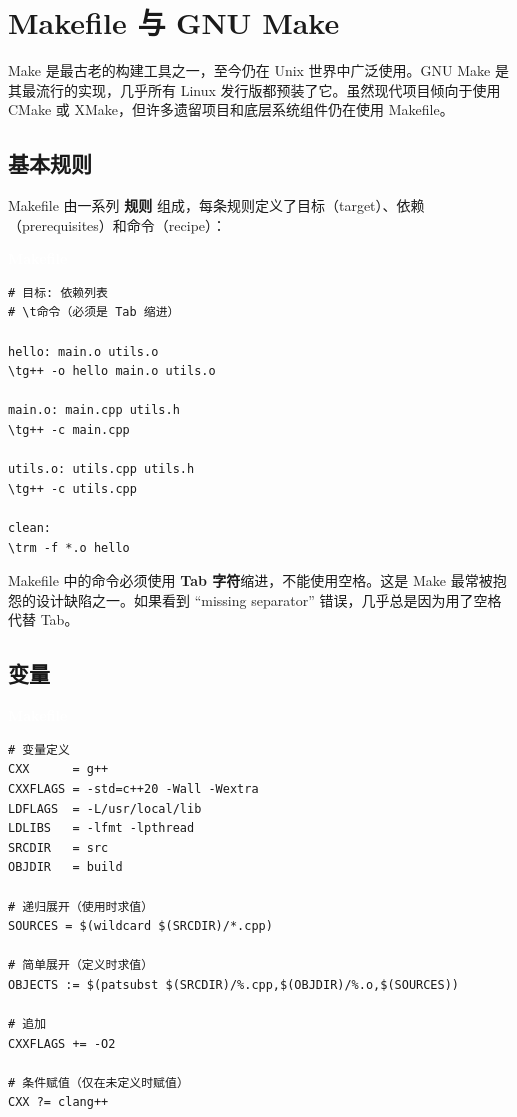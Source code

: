 \documentclass[12pt,a4paper,fontset=fandol]{ctexbook}
\newcommand{\makelabelcmd}{%
  \noindent\begin{tcolorbox}[sharp corners,colback=makeheadbg,colframe=makeheadbg,
    left=6pt,right=6pt,top=2pt,bottom=2pt,boxrule=0pt]
  \textcolor{white}{\small\bfseries\sffamily Makefile}\end{tcolorbox}%
}
\begin{document}
\chapter{Makefile 与 GNU Make}

Make 是最古老的构建工具之一，至今仍在 Unix 世界中广泛使用。GNU Make 是其最流行的实现，几乎所有 Linux 发行版都预装了它。虽然现代项目倾向于使用 CMake 或 XMake，但许多遗留项目和底层系统组件仍在使用 Makefile。

\section{基本规则}

Makefile 由一系列 \textbf{规则} 组成，每条规则定义了目标（target）、依赖（prerequisites）和命令（recipe）：

\makelabelcmd
\begin{lstlisting}[style=bashstyle]
# 目标: 依赖列表
# \t命令（必须是 Tab 缩进）

hello: main.o utils.o
\tg++ -o hello main.o utils.o

main.o: main.cpp utils.h
\tg++ -c main.cpp

utils.o: utils.cpp utils.h
\tg++ -c utils.cpp

clean:
\trm -f *.o hello
\end{lstlisting}

\begin{warning}
Makefile 中的命令必须使用 \textbf{Tab 字符}缩进，不能使用空格。这是 Make 最常被抱怨的设计缺陷之一。如果看到 ``missing separator'' 错误，几乎总是因为用了空格代替 Tab。
\end{warning}

\section{变量}

\makelabelcmd
\begin{lstlisting}[style=bashstyle]
# 变量定义
CXX      = g++
CXXFLAGS = -std=c++20 -Wall -Wextra
LDFLAGS  = -L/usr/local/lib
LDLIBS   = -lfmt -lpthread
SRCDIR   = src
OBJDIR   = build

# 递归展开（使用时求值）
SOURCES = $(wildcard $(SRCDIR)/*.cpp)

# 简单展开（定义时求值）
OBJECTS := $(patsubst $(SRCDIR)/%.cpp,$(OBJDIR)/%.o,$(SOURCES))

# 追加
CXXFLAGS += -O2

# 条件赋值（仅在未定义时赋值）
CXX ?= clang++
\end{lstlisting}
\end{document}
